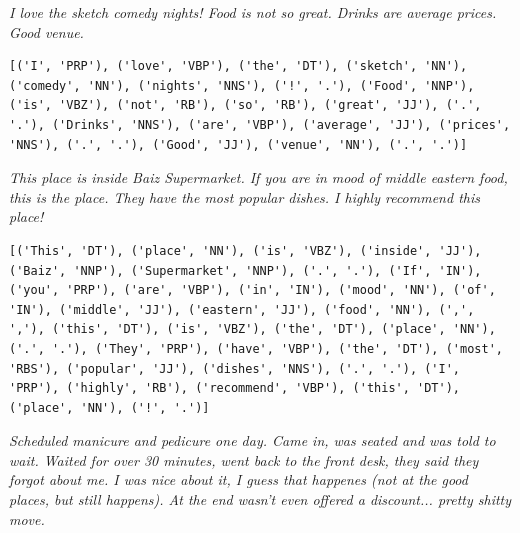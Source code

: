 \textit{I love the sketch comedy nights! Food is not so great. Drinks are average prices. Good venue.}\\
\begin{Verbatim}[breaklines=true, breakanywhere=true] 
[('I', 'PRP'), ('love', 'VBP'), ('the', 'DT'), ('sketch', 'NN'), ('comedy', 'NN'), ('nights', 'NNS'), ('!', '.'), ('Food', 'NNP'), ('is', 'VBZ'), ('not', 'RB'), ('so', 'RB'), ('great', 'JJ'), ('.', '.'), ('Drinks', 'NNS'), ('are', 'VBP'), ('average', 'JJ'), ('prices', 'NNS'), ('.', '.'), ('Good', 'JJ'), ('venue', 'NN'), ('.', '.')]
\end{Verbatim}

\textit{This place is inside Baiz Supermarket. If you are in mood of middle eastern food, this is the place. They have the most popular dishes. I highly recommend this place!}\\
\begin{Verbatim}[breaklines=true, breakanywhere=true] 
[('This', 'DT'), ('place', 'NN'), ('is', 'VBZ'), ('inside', 'JJ'), ('Baiz', 'NNP'), ('Supermarket', 'NNP'), ('.', '.'), ('If', 'IN'), ('you', 'PRP'), ('are', 'VBP'), ('in', 'IN'), ('mood', 'NN'), ('of', 'IN'), ('middle', 'JJ'), ('eastern', 'JJ'), ('food', 'NN'), (',', ','), ('this', 'DT'), ('is', 'VBZ'), ('the', 'DT'), ('place', 'NN'), ('.', '.'), ('They', 'PRP'), ('have', 'VBP'), ('the', 'DT'), ('most', 'RBS'), ('popular', 'JJ'), ('dishes', 'NNS'), ('.', '.'), ('I', 'PRP'), ('highly', 'RB'), ('recommend', 'VBP'), ('this', 'DT'), ('place', 'NN'), ('!', '.')]
\end{Verbatim}

\textit{Scheduled manicure and pedicure one day. Came in, was seated and was told to wait. Waited for over 30 minutes, went back to the front desk, they said they forgot about me. I was nice about it, I guess that happenes (not at the good places, but still happens). At the end wasn't even offered a discount... pretty shitty move.}\\

